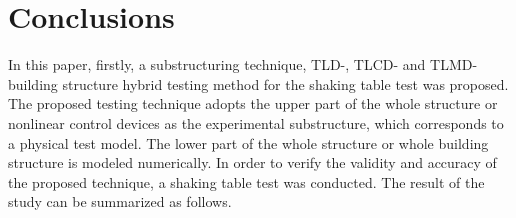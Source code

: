 \chapter{Conclusions}

In this paper, firstly, a substructuring technique, TLD-, TLCD- and TLMD-building structure hybrid testing method for the shaking table test was proposed. The proposed testing technique adopts the upper part of the whole structure or nonlinear control devices as the experimental substructure, which corresponds to a physical test model. The lower part of the whole structure or whole building structure is modeled numerically. In order to verify the validity and accuracy of the proposed technique, a shaking table test was conducted. The result of the study can be summarized as follows.
